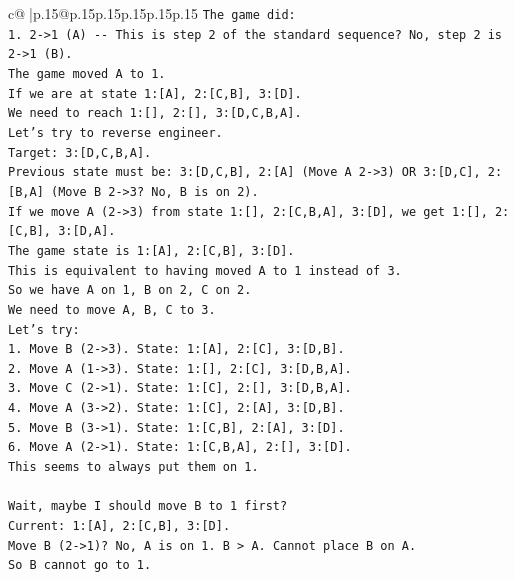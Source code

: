 \documentclass{article}
\begin{document}
{\begin{supertabular}{c@{$\;$}|p{.15\linewidth}@{}p{.15\linewidth}p{.15\linewidth}p{.15\linewidth}p{.15\linewidth}p{.15\linewidth}}
{{{\texttt{The game did:} \\
\texttt{1. 2{-}>1 (A) {-}{-} This is step 2 of the standard sequence? No, step 2 is 2{-}>1 (B).} \\
\texttt{The game moved A to 1.} \\
\texttt{If we are at state 1:{[}A{]}, 2:{[}C,B{]}, 3:{[}D{]}.} \\
\texttt{We need to reach 1:{[}{]}, 2:{[}{]}, 3:{[}D,C,B,A{]}.} \\
\texttt{Let's try to reverse engineer.} \\
\texttt{Target: 3:{[}D,C,B,A{]}.} \\
\texttt{Previous state must be: 3:{[}D,C,B{]}, 2:{[}A{]} (Move A 2{-}>3) OR 3:{[}D,C{]}, 2:{[}B,A{]} (Move B 2{-}>3? No, B is on 2).} \\
\texttt{If we move A (2{-}>3) from state 1:{[}{]}, 2:{[}C,B,A{]}, 3:{[}D{]}, we get 1:{[}{]}, 2:{[}C,B{]}, 3:{[}D,A{]}.} \\
\texttt{The game state is 1:{[}A{]}, 2:{[}C,B{]}, 3:{[}D{]}.} \\
\texttt{This is equivalent to having moved A to 1 instead of 3.} \\
\texttt{So we have A on 1, B on 2, C on 2.} \\
\texttt{We need to move A, B, C to 3.} \\
\texttt{Let's try:} \\
\texttt{1. Move B (2{-}>3). State: 1:{[}A{]}, 2:{[}C{]}, 3:{[}D,B{]}.} \\
\texttt{2. Move A (1{-}>3). State: 1:{[}{]}, 2:{[}C{]}, 3:{[}D,B,A{]}.} \\
\texttt{3. Move C (2{-}>1). State: 1:{[}C{]}, 2:{[}{]}, 3:{[}D,B,A{]}.} \\
\texttt{4. Move A (3{-}>2). State: 1:{[}C{]}, 2:{[}A{]}, 3:{[}D,B{]}.} \\
\texttt{5. Move B (3{-}>1). State: 1:{[}C,B{]}, 2:{[}A{]}, 3:{[}D{]}.} \\
\texttt{6. Move A (2{-}>1). State: 1:{[}C,B,A{]}, 2:{[}{]}, 3:{[}D{]}.} \\
\texttt{This seems to always put them on 1.} \\
\\ 
\texttt{Wait, maybe I should move B to 1 first?} \\
\texttt{Current: 1:{[}A{]}, 2:{[}C,B{]}, 3:{[}D{]}.} \\
\texttt{Move B (2{-}>1)? No, A is on 1. B > A. Cannot place B on A.} \\
\texttt{So B cannot go to 1.} \\
}}}
\end{supertabular}}
\end{document}
